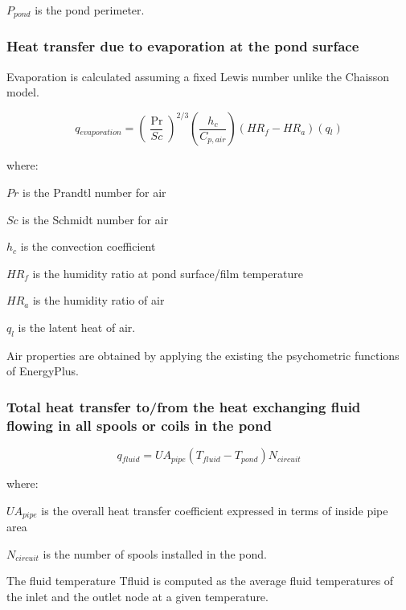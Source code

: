 \(P{}_{pond}\) is the pond perimeter.

\subsubsection{Heat transfer due to evaporation at the pond surface}\label{heat-transfer-due-to-evaporation-at-the-pond-surface}

Evaporation is calculated assuming a fixed Lewis number unlike the Chaisson model.

\begin{equation}
q{}_{evaporation} = {\left( {\frac{{\Pr }}{{Sc}}} \right)^{2/3}}\left( {\frac{{h{}_c}}{{C{}_{p,air}}}} \right)\left( {HR{}_f - HR{}_a} \right)\left( {q{}_l} \right)
\end{equation}

where:

\(Pr\) is the Prandtl number for air

\(Sc\) is the Schmidt number for air

\(h_c\) is the convection coefficient

\(HR_f\) is the humidity ratio at pond surface/film temperature

\(HR_a\) is the humidity ratio of air

\(q_l\) is the latent heat of air.

Air properties are obtained by applying the existing the psychometric functions of EnergyPlus.

\subsubsection{Total heat transfer to/from the heat exchanging fluid flowing in all spools or coils in the pond}\label{total-heat-transfer-tofrom-the-heat-exchanging-fluid-flowing-in-all-spools-or-coils-in-the-pond}

\begin{equation}
q{}_{fluid} = UA{}_{pipe}(T{}_{fluid} - T{}_{pond})N{}_{circuit}
\end{equation}

where:

\(UA{}_{pipe}\) is the overall heat transfer coefficient expressed in terms of inside pipe area

\(N{}_{circuit}\) is the number of spools installed in the pond.

The fluid temperature Tfluid is computed as the average fluid temperatures of the inlet and the outlet node at a given temperature.

